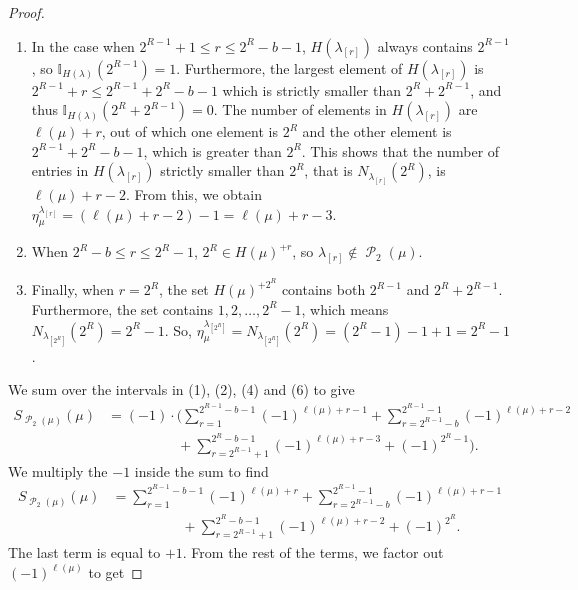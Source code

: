 \documentclass[10pt,a4paper]{amsart}
\newcommand{\la}{\lambda}
\DeclareMathOperator{\p}{\mathcal{P}}
\begin{document}
\begin{proof}
\begin{enumerate}
\item In the case when $2^{R-1} + 1 \leq r \leq 2^{R}-b-1$, $H(\lambda_{[r]})$ always contains $2^{R-1}$, so $\mathbb{I}_{H(\lambda)}(2^{R-1}) = 1$. Furthermore, the largest element of $H(\la_{[r]})$ is $2^{R-1} + r\leq 2^{R-1} + 2^R - b -1$ which is strictly smaller than $2^R + 2^{R-1}$, and thus $\mathbb{I}_{H(\lambda)}(2^R +2^{R-1}) = 0$. The number of elements in $H(\la_{[r]})$ are $\ell(\mu) + r$, out of which one element is $2^R$ and the other element is $2^{R-1} + 2^{R} - b - 1$, which is greater than $2^R$. This shows that the number of entries in $H(\la_{[r]})$ strictly smaller than $2^R$, that is $N_{\la_{[r]}}(2^R)$, is $\ell(\mu) + r - 2$. From this, we obtain $\eta^{\lambda_{[r]}}_\mu = (\ell(\mu)+r -2) - 1 = \ell(\mu) + r - 3$.

\item When $2^R - b \leq r \leq 2^{R}-1$, $2^{R}\in H(\mu)^{+r}$, so $\lambda_{[r]}\not\in \p_2(\mu)$.
\item Finally, when $r = 2^R$, the set $H(\mu)^{+2^R}$ contains both $2^{R-1}$ and $2^R + 2^{R-1}$. Furthermore, the set contains $1,2,\ldots, 2^{R}-1$, which means $N_{\la_{[2^R]}}(2^R) = 2^R - 1$.
So, $\eta_{\mu}^{\lambda_{[2^R]}} = N_{\lambda_{[2^R]}}(2^R) = (2^{R} - 1) -1 + 1 = 2^R -1$.
\end{enumerate}

We sum over the intervals in (1), (2), (4) and (6) to give
\begin{align*}
S_{\p_2(\mu)}({\mu}) &= (-1)\cdot\Bigg(\sum\limits_{r = 1}^{2^{R-1}-b-1} (-1)^{\ell(\mu)+r-1} + \sum\limits_{r = 2^{R-1}-b}^{2^{R-1}-1} (-1)^{\ell(\mu)+r-2} \\ 
&\qquad\qquad\quad+ \sum\limits_{r=2^{R-1} +1}^{2^{R}-b-1} (-1)^{\ell(\mu)+r - 3} + (-1)^{2^R - 1}\Bigg).
\end{align*}
We multiply the $-1$ inside the sum to find
\begin{align*}
S_{\p_2(\mu)}({\mu}) &= \sum\limits_{r = 1}^{2^{R-1}-b-1} (-1)^{\ell(\mu)+r} + \sum\limits_{r = 2^{R-1}-b}^{2^{R-1}-1} (-1)^{\ell(\mu)+r-1} \\ 
&\qquad\qquad\quad+ \sum\limits_{r=2^{R-1} +1}^{2^{R}-b-1} (-1)^{\ell(\mu)+r - 2} + (-1)^{2^R}.
\end{align*}
The last term is equal to $+1$. From the rest of the terms, we factor out $(-1)^{\ell(\mu)}$ to get


\end{proof}
\end{document}
